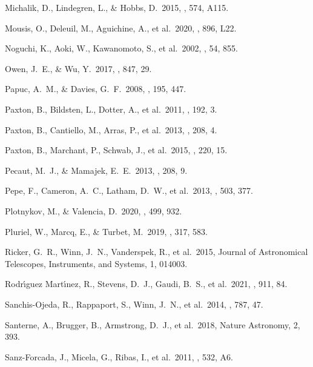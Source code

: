  Michalik, D., Lindegren, L., \& Hobbs, D.\ 2015, \aap, 574, A115.

 Mousis, O., Deleuil, M., Aguichine, A., et al.\ 2020, \apjl, 896, L22.

 Noguchi, K., Aoki, W., Kawanomoto, S., et al.\ 2002, \pasj, 54, 855.

 Owen, J.~E., \& Wu, Y.\ 2017, \apj, 847, 29.

 Papuc, A.~M., \& Davies, G.~F.\ 2008, \icarus, 195, 447.

 Paxton, B., Bildsten, L., Dotter, A., et al.\ 2011, \apjs, 192, 3.

 Paxton, B., Cantiello, M., Arras, P., et al.\ 2013, \apjs, 208, 4.

 Paxton, B., Marchant, P., Schwab, J., et al.\ 2015, \apjs, 220, 15.

 Pecaut, M.~J., \& Mamajek, E.~E.\ 2013, \apjs, 208, 9.

 Pepe, F., Cameron, A.~C., Latham, D.~W., et al.\ 2013, \nat, 503, 377.

 Plotnykov, M., \& Valencia, D.\ 2020, \mnras, 499, 932.

 Pluriel, W., Marcq, E., \& Turbet, M.\ 2019, \icarus, 317, 583.

 Ricker, G.~R., Winn, J.~N., Vanderspek, R., et al.\ 2015, Journal of Astronomical Telescopes, Instruments, and Systems, 1, 014003.

 Rodr{\'\i}guez Mart{\'\i}nez, R., Stevens, D.~J., Gaudi, B.~S., et al.\ 2021, \apj, 911, 84.

 Sanchis-Ojeda, R., Rappaport, S., Winn, J.~N., et al.\ 2014, \apj, 787, 47.

 Santerne, A., Brugger, B., Armstrong, D.~J., et al.\ 2018, Nature Astronomy, 2, 393.

 Sanz-Forcada, J., Micela, G., Ribas, I., et al.\ 2011, \aap, 532, A6.


